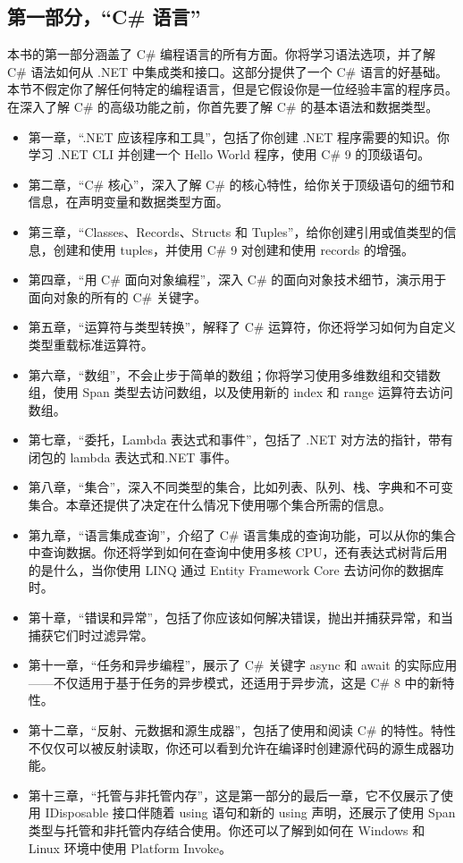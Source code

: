 \subsection*{第一部分，“C\# 语言”}
本书的第一部分涵盖了 C\# 编程语言的所有方面。你将学习语法选项，并了解 C\# 语法如何从 .NET 中集成类和接口。这部分提供了一个 C\# 语言的好基础。本节不假定你了解任何特定的编程语言，但是它假设你是一位经验丰富的程序员。在深入了解 C\# 的高级功能之前，你首先要了解 C\# 的基本语法和数据类型。
\begin{itemize}
    \item 第一章，“.NET 应该程序和工具”，包括了你创建 .NET 程序需要的知识。你学习 .NET CLI 并创建一个 Hello World 程序，使用 C\# 9 的顶级语句。
    \item 第二章，“C\# 核心”，深入了解 C\# 的核心特性，给你关于顶级语句的细节和信息，在声明变量和数据类型方面。
    \item 第三章，“Classes、Records、Structs 和 Tuples”，给你创建引用或值类型的信息，创建和使用 tuples，并使用 C\# 9 对创建和使用 records 的增强。
    \item 第四章，“用 C\# 面向对象编程”，深入 C\# 的面向对象技术细节，演示用于面向对象的所有的 C\# 关键字。
    \item 第五章，“运算符与类型转换”，解释了 C\# 运算符，你还将学习如何为自定义类型重载标准运算符。
    \item 第六章，“数组”，不会止步于简单的数组；你将学习使用多维数组和交错数组，使用 Span 类型去访问数组，以及使用新的 index 和 range 运算符去访问数组。
    \item 第七章，“委托，Lambda 表达式和事件”，包括了 .NET 对方法的指针，带有闭包的 lambda 表达式和.NET 事件。
    \item 第八章，“集合”，深入不同类型的集合，比如列表、队列、栈、字典和不可变集合。本章还提供了决定在什么情况下使用哪个集合所需的信息。
    \item 第九章，“语言集成查询”，介绍了 C\# 语言集成的查询功能，可以从你的集合中查询数据。你还将学到如何在查询中使用多核 CPU，还有表达式树背后用的是什么，当你使用 LINQ 通过 Entity Framework Core 去访问你的数据库时。
    \item 第十章，“错误和异常”，包括了你应该如何解决错误，抛出并捕获异常，和当捕获它们时过滤异常。
    \item 第十一章，“任务和异步编程”，展示了 C\# 关键字 async 和 await 的实际应用——不仅适用于基于任务的异步模式，还适用于异步流，这是 C\# 8 中的新特性。
    \item 第十二章，“反射、元数据和源生成器”，包括了使用和阅读 C\# 的特性。特性不仅仅可以被反射读取，你还可以看到允许在编译时创建源代码的源生成器功能。
    \item 第十三章，“托管与非托管内存”，这是第一部分的最后一章，它不仅展示了使用 IDisposable 接口伴随着 using 语句和新的 using 声明，还展示了使用 Span 类型与托管和非托管内存结合使用。你还可以了解到如何在 Windows 和 Linux 环境中使用 Platform Invoke。
\end{itemize}

